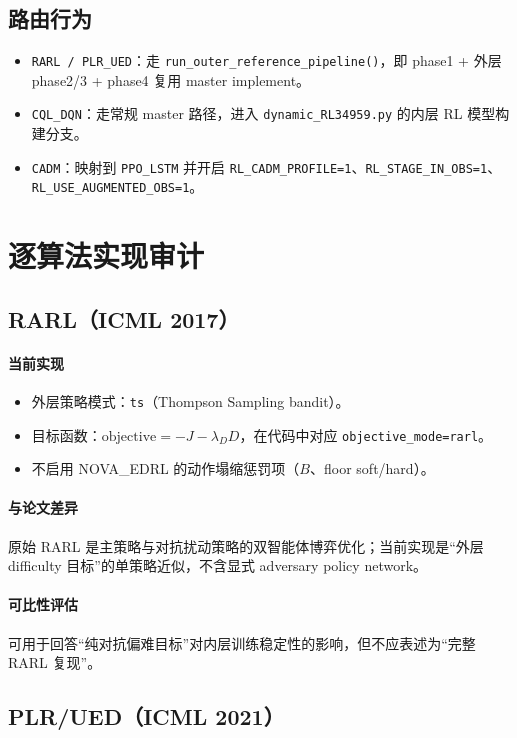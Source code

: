 ﻿\documentclass[12pt,a4paper]{ctexart}
\begin{document}
\subsection{路由行为}
\begin{itemize}
  \item \texttt{RARL / PLR\_UED}：走 \texttt{run\_outer\_reference\_pipeline()}，即 phase1 + 外层 phase2/3 + phase4 复用 master implement。
  \item \texttt{CQL\_DQN}：走常规 master 路径，进入 \texttt{dynamic\_RL34959.py} 的内层 RL 模型构建分支。
  \item \texttt{CADM}：映射到 \texttt{PPO\_LSTM} 并开启 \texttt{RL\_CADM\_PROFILE=1}、\texttt{RL\_STAGE\_IN\_OBS=1}、\texttt{RL\_USE\_AUGMENTED\_OBS=1}。
\end{itemize}

\section{逐算法实现审计}
\subsection{RARL（ICML 2017）}
\paragraph{当前实现}
\begin{itemize}
  \item 外层策略模式：\texttt{ts}（Thompson Sampling bandit）。
  \item 目标函数：\( \text{objective} = -J - \lambda_D D \)，在代码中对应 \texttt{objective\_mode=rarl}。
  \item 不启用 NOVA\_EDRL 的动作塌缩惩罚项（\(B\)、floor soft/hard）。
\end{itemize}

\paragraph{与论文差异}
原始 RARL 是主策略与对抗扰动策略的双智能体博弈优化；当前实现是“外层 difficulty 目标”的单策略近似，不含显式 adversary policy network。

\paragraph{可比性评估}
可用于回答“纯对抗偏难目标”对内层训练稳定性的影响，但不应表述为“完整 RARL 复现”。

\subsection{PLR/UED（ICML 2021）}
\end{document}
